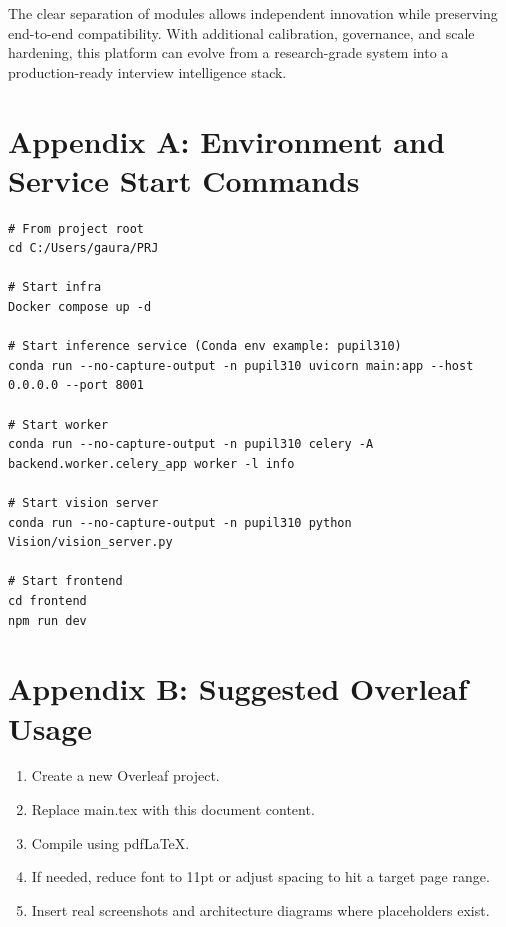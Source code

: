 \documentclass[12pt,a4paper]{report}
\begin{document}
The clear separation of modules allows independent innovation while preserving end-to-end compatibility. With additional calibration, governance, and scale hardening, this platform can evolve from a research-grade system into a production-ready interview intelligence stack.

\appendix

\chapter{Appendix A: Environment and Service Start Commands}
\begin{lstlisting}[style=pythonstyle,caption={Representative startup sequence on Windows PowerShell}]
# From project root
cd C:/Users/gaura/PRJ

# Start infra
Docker compose up -d

# Start inference service (Conda env example: pupil310)
conda run --no-capture-output -n pupil310 uvicorn main:app --host 0.0.0.0 --port 8001

# Start worker
conda run --no-capture-output -n pupil310 celery -A backend.worker.celery_app worker -l info

# Start vision server
conda run --no-capture-output -n pupil310 python Vision/vision_server.py

# Start frontend
cd frontend
npm run dev
\end{lstlisting}

\chapter{Appendix B: Suggested Overleaf Usage}
\begin{enumerate}[leftmargin=1.5em]
\item Create a new Overleaf project.
\item Replace main.tex with this document content.
\item Compile using pdfLaTeX.
\item If needed, reduce font to 11pt or adjust spacing to hit a target page range.
\item Insert real screenshots and architecture diagrams where placeholders exist.
\end{enumerate}
\end{document}

